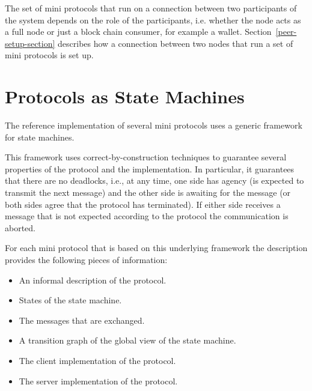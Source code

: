 \documentclass{report}
\newcommand{\hide}[1]{}
\theoremstyle{definition}{
  \newtheorem{lemma}{Lemma}[section] %
  \newtheorem{definition}[lemma]{Definition}
}
\theoremstyle{theorem}{
  \newtheorem{invariant}[lemma]{Invariant}
  \newtheorem{proofobligation}[lemma]{Proof Obligation}
}
\numberwithin{equation}{lemma}
\begin{document}
The set of mini protocols that run on a connection between two participants of the system
depends on the role of the participants, i.e. whether the node acts as a full node or just
a block chain consumer, for example a wallet.
Section~\ref{peer-setup-section} describes how a connection between two nodes
that run a set of mini protocols is set up.

\section{Protocols as State Machines}
The reference implementation of several mini protocols uses a generic framework
for state machines.
\hide{
The Haskell implementation of the state machine framework is described in
Section~\ref{Haskell-state-machine}.
}
This framework uses correct-by-construction techniques to guarantee
several properties of the protocol and the implementation.
In particular, it guarantees that there are no deadlocks, i.e., at any time, one side has agency
(is expected to transmit the next message) and the other side is awaiting for
the message (or both sides agree that the protocol has terminated).
If either side receives a message that is not expected according to the protocol
the communication is aborted.

For each mini protocol that is based on this underlying framework the description provides the
following pieces of information:

\begin{itemize}
\item An informal description of the protocol.
\item States of the state machine.
\item The messages that are exchanged.
\item A transition graph of the global view of the state machine.
\item The client implementation of the protocol.
\item The server implementation of the protocol.
\end{itemize}
\end{document}
